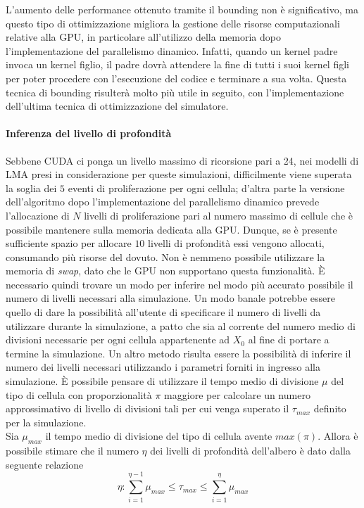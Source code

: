 L'aumento delle performance ottenuto tramite il bounding non è significativo,
ma questo tipo di ottimizzazione migliora la gestione delle risorse 
computazionali relative alla GPU, in particolare all'utilizzo della memoria
dopo l'implementazione del parallelismo dinamico. Infatti,
quando un kernel padre invoca un kernel figlio,
il padre dovrà attendere la fine di tutti i suoi kernel figli per
poter procedere con l'esecuzione del codice e terminare a sua volta.
Questa tecnica di bounding risulterà molto più utile in seguito, con
l'implementazione dell'ultima tecnica di ottimizzazione del simulatore.

\paragraph{Inferenza del livello di profondità}\mbox{}

Sebbene CUDA ci ponga un livello massimo di ricorsione pari a 24,
nei modelli di LMA presi in considerazione per queste simulazioni, difficilmente
viene superata la soglia dei $5$ eventi di proliferazione per ogni cellula; 
d'altra parte la versione dell'algoritmo dopo l'implementazione del 
parallelismo dinamico prevede l'allocazione di $N$ livelli di proliferazione 
pari al numero massimo di cellule che è possibile mantenere sulla memoria 
dedicata alla GPU. Dunque, se è presente sufficiente
spazio per allocare $10$ livelli di profondità essi vengono allocati,
consumando più risorse del dovuto. Non è nemmeno possibile utilizzare
la memoria di \textit{swap}, dato che le GPU non supportano questa
funzionalità.
È necessario quindi trovare un modo per inferire nel modo più accurato
possibile il numero di livelli necessari alla simulazione.
Un modo banale potrebbe essere quello di dare la possibilità all'utente di
specificare il numero di livelli da utilizzare durante la simulazione,
a patto che sia al corrente del numero medio di divisioni necessarie per ogni cellula
appartenente ad $X_{0}$ al fine di portare a termine la simulazione.
Un altro metodo risulta essere la possibilità di inferire il numero dei livelli
necessari utilizzando i parametri forniti in ingresso alla simulazione.
È possibile pensare di utilizzare il tempo medio di divisione $\mu$ del tipo 
di cellula con proporzionalità $\pi$ maggiore per calcolare un numero
approssimativo di livello di divisioni tali per cui venga superato il
$\tau_{max}$ definito per la simulazione.
\\
Sia $\mu_{max}$ il tempo medio di divisione
del tipo di cellula avente $max(\pi)$.
Allora è possibile stimare che il numero $\eta$ dei livelli di profondità
dell'albero è dato dalla seguente relazione
$$\eta : \sum\limits_{i=1}^{\eta - 1}
\mu_{max} \leqslant \tau_{max} \leqslant \sum\limits_{i=1}^{\eta} \mu_{max}$$

